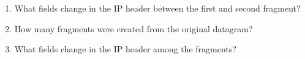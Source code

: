 \begin{enumerate}[label=\bfseries Problem \arabic*:,leftmargin=*,labelindent=1em]
        \soln
        \item What fields change in the IP header between the first and second fragment?\\[0.2mm]
        \soln
        \item How many fragments were created from the original datagram?\\[0.2mm]
        \soln
        \item What fields change in the IP header among the fragments?\\[0.2mm]
        \soln
    \end{enumerate}
\newpage